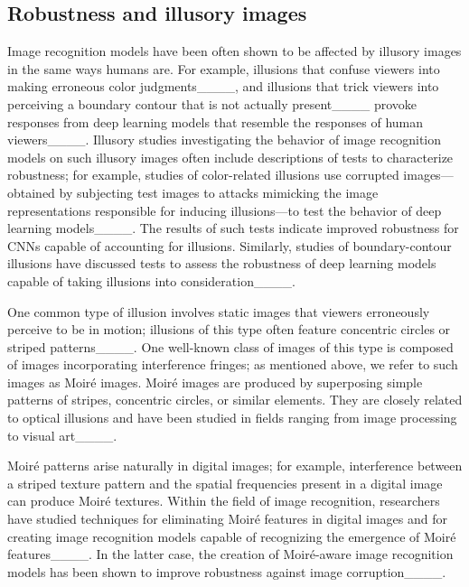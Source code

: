 \subsection{Robustness and illusory images}
\label{sec:Illusion_Moire_Robust}
Image recognition models have been often shown to be
affected by illusory images in the same ways humans are. For example,
illusions that confuse viewers into making erroneous color 
judgments____, and illusions that trick viewers into 
perceiving a boundary contour that is not actually present____ 
provoke responses from deep learning models that resemble the responses 
of human viewers____.
Illusory studies investigating the behavior of image recognition models
on such illusory images often include descriptions of tests
to characterize robustness; for example, studies of color-related 
illusions use corrupted images---obtained by subjecting test images 
to attacks mimicking the image representations responsible for
inducing illusions---to test the behavior of deep learning 
models____. The results of such tests indicate improved
robustness for CNNs capable of accounting for illusions.
Similarly, studies of boundary-contour illusions have
discussed tests to assess the robustness of deep learning models
capable of taking illusions into consideration____.



One common type of illusion involves static images
that viewers erroneously perceive to be in motion;
illusions of this type often feature concentric circles 
or striped patterns____. One
well-known class of images of this type is composed of images
incorporating interference fringes; as mentioned above, we refer to such images as Moir\'e images.
Moir\'e images are produced by superposing
simple patterns of stripes, concentric circles,
or similar elements. They are closely related to
optical illusions and have been studied in fields
ranging from image processing to visual art____.



Moir\'e patterns arise naturally in digital images;
for example, interference between a striped texture pattern
and the spatial frequencies present in a digital image
can produce Moir\'e textures.
Within the field of image recognition, researchers have studied
techniques for eliminating Moir\'e features in digital images
and for creating image recognition models capable of recognizing
the emergence of Moir\'e features____.
In the latter case, the creation of Moir\'e-aware image recognition
models has been shown to improve robustness against
image corruption____.




